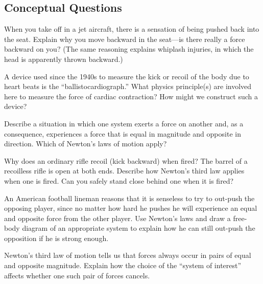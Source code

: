 \documentclass[
]{book}
\newenvironment{conceptual-questions}{}{}
\begin{document}
\hypertarget{fs-id1460367}{}
\begin{conceptual-questions}

\hypertarget{conceptual-questions-14}{%
\subsection{Conceptual Questions}\label{conceptual-questions-14}}

\hypertarget{fs-id1572333}{}
\leavevmode\hypertarget{fs-id1421833}{}%
When you take off in a jet aircraft, there is a sensation of being
pushed back into the seat. Explain why you move backward in the
seat---is there really a force backward on you? (The same reasoning
explains whiplash injuries, in which the head is apparently thrown
backward.)

\hypertarget{fs-id1595226}{}
\leavevmode\hypertarget{fs-id1600814}{}%
A device used since the 1940s to measure the kick or recoil of the body
due to heart beats is the ``ballistocardiograph.'' What physics
principle(s) are involved here to measure the force of cardiac
contraction? How might we construct such a device?

\hypertarget{fs-id2846557}{}
\leavevmode\hypertarget{fs-id1266684}{}%
Describe a situation in which one system exerts a force on another and,
as a consequence, experiences a force that is equal in magnitude and
opposite in direction. Which of Newton's laws of motion apply?

\hypertarget{fs-id2661705}{}
\leavevmode\hypertarget{fs-id1415968}{}%
Why does an ordinary rifle recoil (kick backward) when fired? The barrel
of a recoilless rifle is open at both ends. Describe how Newton's third
law applies when one is fired. Can you safely stand close behind one
when it is fired?

\hypertarget{fs-id2423524}{}
\leavevmode\hypertarget{fs-id1677679}{}%
An American football lineman reasons that it is senseless to try to
out-push the opposing player, since no matter how hard he pushes he will
experience an equal and opposite force from the other player. Use
Newton's laws and draw a free-body diagram of an appropriate system to
explain how he can still out-push the opposition if he is strong enough.

\hypertarget{fs-id2355576}{}
\leavevmode\hypertarget{fs-id1550500}{}%
Newton's third law of motion tells us that forces always occur in pairs
of equal and opposite magnitude. Explain how the choice of the ``system
of interest'' affects whether one such pair of forces cancels.

\end{conceptual-questions}
\end{document}
